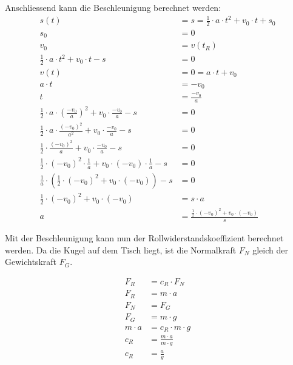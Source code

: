 Anschliessend kann die Beschleunigung berechnet werden:
\begin{align}
    s(t) &= s = \frac{1}{2} \cdot a \cdot t^2 + v_0 \cdot t + s_0\\
    s_0 &= 0\\
    v_0 &= v(t_R)\\
    \frac{1}{2} \cdot a \cdot t^2 + v_0 \cdot t - s &= 0\\
    v(t) &= 0 = a \cdot t + v_0\\
    a \cdot t &= -v_0\\
    t &= \frac{-v_0}{a}\\
    \frac{1}{2} \cdot a \cdot (\frac{-v_0}{a})^2 + v_0 \cdot \frac{-v_0}{a} - s &= 0\\
    \frac{1}{2} \cdot a \cdot \frac{(-v_0)^2}{a^2} + v_0 \cdot \frac{-v_0}{a} - s &= 0\\
    \frac{1}{2} \cdot \frac{(-v_0)^2}{a} + v_0 \cdot \frac{-v_0}{a} - s &= 0\\
    \frac{1}{2} \cdot (-v_0)^2 \cdot \frac{1}{a} + v_0 \cdot (-v_0) \cdot \frac{1}{a} - s &= 0\\
    \frac{1}{a} \cdot (\frac{1}{2} \cdot (-v_0)^2 + v_0 \cdot (-v_0)) - s &= 0\\
    \frac{1}{2} \cdot (-v_0)^2 + v_0 \cdot (-v_0) &= s \cdot a\\
    a &= \frac{\frac{1}{2} \cdot (-v_0)^2 + v_0 \cdot (-v_0)}{s}
\end{align}

Mit der Beschleunigung kann nun der Rollwiderstandskoeffizient berechnet werden.
Da die Kugel auf dem Tisch liegt, ist die Normalkraft $F_N$ gleich der Gewichtskraft $F_G$.

\begin{align}
    F_R &= c_R \cdot F_N\\
    F_R &= m \cdot a\\
    F_N &= F_G\\
    F_G &= m \cdot g\\
    m \cdot a &= c_R \cdot m \cdot g\\
    c_R &= \frac{m \cdot a}{m \cdot g}\\
    c_R &= \frac{a}{g}
\end{align}

